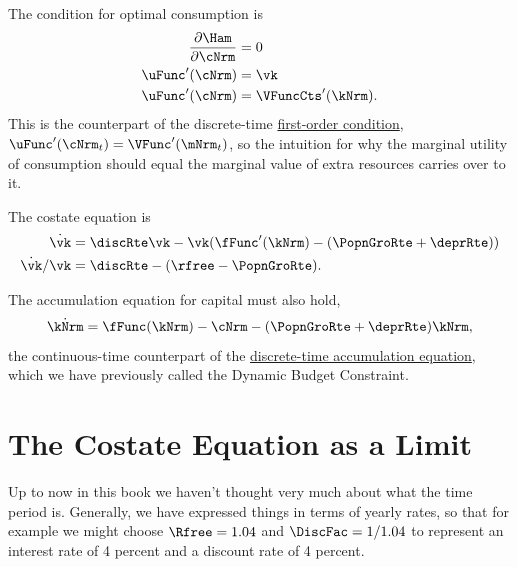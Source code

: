 \documentclass{econark}
\begin{document}
The condition for optimal consumption is
\begin{equation}\begin{gathered}\begin{aligned}
        \frac{\partial \Ham}{\partial \cNrm} & =  0  \\
        \uFunc^{\prime}(\cNrm) & =  \vk
\\  \uFunc^{\prime}(\cNrm) & =  \VFuncCts'(\kNrm) . \label{eq:uceqvk}
\end{aligned}\end{gathered}\end{equation}
This is the counterpart of the discrete-time \hyperref[eq:HVD-discFOC]{first-order condition}, $\uFunc^{\prime}(\cNrm_{t})=\VFunc^{\prime}(\mNrm_{t})$, so the intuition for why the marginal utility of consumption should equal the marginal value of extra resources carries over to it.

The costate equation is
\begin{equation}\begin{gathered}\begin{aligned}
        \dot{\vk} & =  \discRte\vk - \vk(\fFunc^{\prime}(\kNrm)-(\PopnGroRte+\deprRte))
\\      \dot{\vk}/\vk & =  \discRte-(\rfree-\PopnGroRte) . \label{eq:lamgrow}
\end{aligned}\end{gathered}\end{equation}

The accumulation equation for capital must also hold,
\begin{equation}
  \dot{\kNrm} = \fFunc(\kNrm)-\cNrm-(\PopnGroRte+\deprRte)\kNrm, \label{eq:accum}
\end{equation}
the continuous-time counterpart of the \hyperref[eq:HVD-bellman]{discrete-time accumulation equation}, which we have previously called the Dynamic Budget Constraint.

\section{The Costate Equation as a Limit}

Up to now in this book we haven't thought very much about what the
time period is. Generally, we have expressed things in terms of
yearly rates, so that for example we might choose $\Rfree=1.04$ and
$\DiscFac=1/1.04$ to represent an interest rate of
4 percent and a discount rate of 4 percent.
\end{document}
